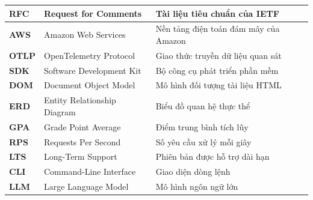 \documentclass[../BTL.tex]{subfiles}
\begin{document}
\begin{longtable}{|p{3.2cm}|p{3.5cm}|p{7.1cm}|}
	\textbf{RFC} & Request for Comments & Tài liệu tiêu chuẩn của IETF\\ \hline
	\textbf{AWS} & Amazon Web Services & Nền tảng điện toán đám mây của Amazon\\ \hline
	\textbf{OTLP} & OpenTelemetry Protocol & Giao thức truyền dữ liệu quan sát\\ \hline
	\textbf{SDK} & Software Development Kit & Bộ công cụ phát triển phần mềm\\ \hline
	\textbf{DOM} & Document Object Model & Mô hình đối tượng tài liệu HTML\\ \hline
	\textbf{ERD} & Entity Relationship Diagram & Biểu đồ quan hệ thực thể\\ \hline
	\textbf{GPA} & Grade Point Average & Điểm trung bình tích lũy\\ \hline
	\textbf{RPS} & Requests Per Second & Số yêu cầu xử lý mỗi giây\\ \hline
	\textbf{LTS} & Long-Term Support & Phiên bản được hỗ trợ dài hạn\\ \hline
	\textbf{CLI} & Command-Line Interface & Giao diện dòng lệnh\\ \hline
	\textbf{LLM} & Large Language Model & Mô hình ngôn ngữ lớn\\ \hline
\hline
\end{longtable}
\onehalfspacing
\end{document}
